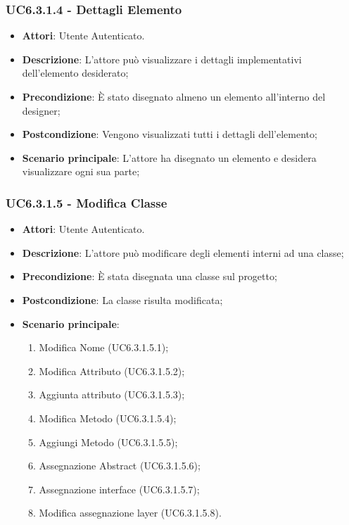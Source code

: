 \subsubsection{UC6.3.1.4 - Dettagli Elemento} 
\label{sssec:UC6.3.1.4} 
\begin{itemize} 
\item \textbf{Attori}: Utente Autenticato.
\item \textbf{Descrizione}: L'attore può visualizzare i dettagli implementativi dell'elemento desiderato;
\item \textbf{Precondizione}: È stato disegnato almeno un elemento all'interno del designer;
\item \textbf{Postcondizione}: Vengono visualizzati tutti i dettagli dell'elemento;
\item \textbf{Scenario principale}: L'attore ha disegnato un elemento e desidera visualizzare ogni sua parte;\end{itemize} 
\subsubsection{UC6.3.1.5 - Modifica Classe} 
\label{sssec:UC6.3.1.5} 
\begin{itemize} 
\item \textbf{Attori}: Utente Autenticato.
\item \textbf{Descrizione}: L'attore può modificare degli elementi interni ad una classe;
\item \textbf{Precondizione}: È stata disegnata una classe sul progetto;
\item \textbf{Postcondizione}: La classe risulta modificata;
\item \textbf{Scenario principale}: \begin{enumerate}\item Modifica Nome (UC6.3.1.5.1);\item Modifica Attributo (UC6.3.1.5.2);\item Aggiunta attributo (UC6.3.1.5.3);\item Modifica Metodo (UC6.3.1.5.4);\item Aggiungi Metodo (UC6.3.1.5.5);\item Assegnazione Abstract (UC6.3.1.5.6);\item Assegnazione interface (UC6.3.1.5.7);\item Modifica assegnazione layer (UC6.3.1.5.8). 
 \end{enumerate}
\end{itemize} 
